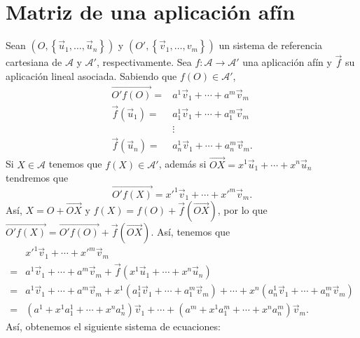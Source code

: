 \section{Matriz de una aplicación afín}
Sean $\displaystyle \left(O, \left\{ \vec{u}_{1}, \ldots, \vec{u}_{n}\right\} \right) $ y $\displaystyle \left(O', \left\{ \vec{v}_{1}, \ldots, v_{m}\right\} \right) $ un sistema de referencia cartesiana de $\displaystyle \mathcal{A} $ y $\displaystyle \mathcal{A}' $, respectivamente. Sea $\displaystyle f : \mathcal{A} \to \mathcal{A}' $ una aplicación afín y $\displaystyle \vec{f} $ su aplicación lineal asociada. Sabiendo que $\displaystyle f\left(O\right) \in \mathcal{A}' $,
\[
\begin{split}
	\overrightarrow{O'f\left(O\right)} =&  a^{1}\vec{v}_{1} + \cdots + a^{m}\vec{v}_{m} \\
	\vec{f}\left(\vec{u}_{1}\right) =&  a^{1}_{1}\vec{v}_{1} + \cdots + a^{m}_{1}\vec{v}_{m} \\
& \vdots \\
	\vec{f}\left(\vec{u}_{n}\right) =& a^{1}_{n}\vec{v}_{1} + \cdots + a^{m}_{n}\vec{v}_{m}.
\end{split}
\]
Si $\displaystyle X \in \mathcal{A} $ tenemos que $\displaystyle f\left(X\right) \in \mathcal{A}' $, además si $\displaystyle \overrightarrow{OX} = x^{1}\vec{u}_{1} + \cdots + x^{n}\vec{u}_{n} $ tendremos que
\[\overrightarrow{O'f\left(X\right)} = x'^{1}\vec{v}_{1} + \cdots + x'^{m}\vec{v}_{m}.\]
Así, $\displaystyle X = O + \overrightarrow{OX} $ y $\displaystyle f\left(X\right) = f\left(O\right) + \vec{f}\left(\overrightarrow{OX}\right) $, por lo que $\displaystyle \overrightarrow{O'f\left(X\right)} = \overrightarrow{O'f\left(O\right)}+\vec{f}\left(\overrightarrow{OX}\right) $. Así, tenemos que 
\[
\begin{split}
& x'^{1}\vec{v}_{1} + \cdots + x'^{m}\vec{v}_{m} \\
= & a^{1}\vec{v}_{1}+\cdots + a^{m}\vec{v}_{m} + \vec{f}\left(x^{1}\vec{u}_{1} + \cdots + x^{n}\vec{u}_{n}\right) \\
= & a^{1}\vec{v}_{1} + \cdots + a^{m}\vec{v}_{m} + x^{1}\left(a^{1}_{1}\vec{v}_{1} + \cdots + a^{m}_{1}\vec{v}_{m}\right)+ \cdots + x^{n}\left(a^{1}_{n}\vec{v}_{1} + \cdots + a^{m}_{n}\vec{v}_{m}\right) \\
= & \left(a^{1}+x^{1}a^{1}_{1} + \cdots + x^{n}a^{1}_{n}\right)\vec{v}_{1} + \cdots + \left(a^{m} + x^{1}a^{m}_{1} + \cdots + x^{n}a^{m}_{n}\right)\vec{v}_{m}.
\end{split}
\]
Así, obtenemos el siguiente sistema de ecuaciones:
